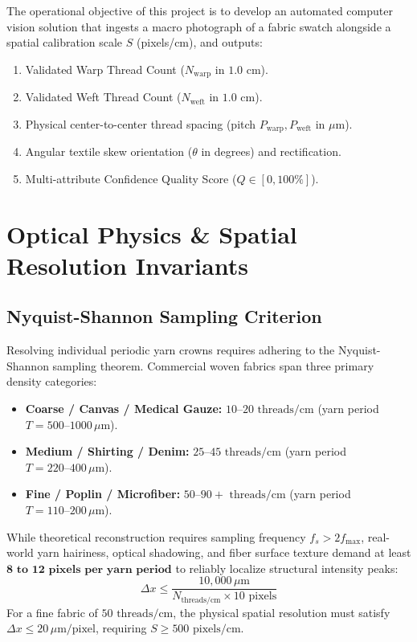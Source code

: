 \documentclass[11pt,a4paper]{article}
\begin{document}
The operational objective of this project is to develop an automated computer vision solution that ingests a macro photograph of a fabric swatch alongside a spatial calibration scale $S$ (pixels/cm), and outputs:
\begin{enumerate}
    \item Validated Warp Thread Count ($N_{\text{warp}}$ in $1.0\text{ cm}$).
    \item Validated Weft Thread Count ($N_{\text{weft}}$ in $1.0\text{ cm}$).
    \item Physical center-to-center thread spacing (pitch $P_{\text{warp}}, P_{\text{weft}}$ in $\mu\text{m}$).
    \item Angular textile skew orientation ($\theta$ in degrees) and rectification.
    \item Multi-attribute Confidence Quality Score ($Q \in [0, 100\%]$).
\end{enumerate}

\section{Optical Physics \& Spatial Resolution Invariants}

\subsection{Nyquist-Shannon Sampling Criterion}
Resolving individual periodic yarn crowns requires adhering to the Nyquist-Shannon sampling theorem. Commercial woven fabrics span three primary density categories:
\begin{itemize}
    \item \textbf{Coarse / Canvas / Medical Gauze:} $10\text{--}20\text{ threads/cm}$ (yarn period $T = 500\text{--}1000\,\mu\text{m}$).
    \item \textbf{Medium / Shirting / Denim:} $25\text{--}45\text{ threads/cm}$ (yarn period $T = 220\text{--}400\,\mu\text{m}$).
    \item \textbf{Fine / Poplin / Microfiber:} $50\text{--}90+\text{ threads/cm}$ (yarn period $T = 110\text{--}200\,\mu\text{m}$).
\end{itemize}

While theoretical reconstruction requires sampling frequency $f_s > 2 f_{\max}$, real-world yarn hairiness, optical shadowing, and fiber surface texture demand at least $\mathbf{8\text{ to }12\text{ pixels per yarn period}}$ to reliably localize structural intensity peaks:
\begin{equation}
    \Delta x \le \frac{10,000\,\mu\text{m}}{N_{\text{threads/cm}} \times 10\text{ pixels}}
\end{equation}
For a fine fabric of $50\text{ threads/cm}$, the physical spatial resolution must satisfy $\Delta x \le 20\,\mu\text{m/pixel}$, requiring $S \ge 500\text{ pixels/cm}$.
\end{document}
